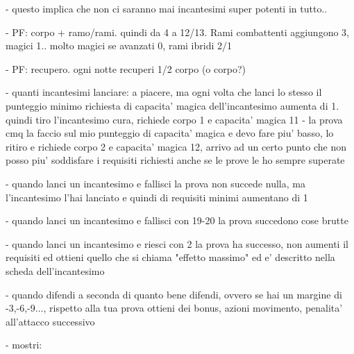 \documentclass[12pt,a4paper,twoside,openany,twocolumn]{book}
\begin{document}
- questo implica che non ci saranno mai incantesimi super potenti in tutto..

- PF: corpo + ramo/rami. quindi da 4 a 12/13. Rami combattenti aggiungono 3, 
magici 1.. molto magici se avanzati 0, rami ibridi 2/1

- PF: recupero. ogni notte recuperi 1/2 corpo (o corpo?)

- quanti incantesimi lanciare:  a piacere, ma ogni volta che lanci lo stesso il punteggio minimo richiesta di capacita' magica dell'incantesimo aumenta di 1. quindi tiro l'incantesimo cura, richiede corpo 1 e capacita' magica 11 - la prova cmq la faccio sul mio punteggio di capacita' magica e devo fare piu' basso, lo ritiro e richiede corpo 2 e capacita' magica 12, arrivo ad un certo punto che non posso piu' soddisfare i requisiti richiesti anche se le prove le ho sempre superate

- quando lanci un incantesimo e fallisci la prova non succede nulla, ma l'incantesimo l'hai lanciato e quindi di requisiti minimi aumentano di 1

- quando lanci un incantesimo e fallisci con 19-20 la prova succedono cose  brutte

- quando lanci un incantesimo e riesci con 2 la prova ha successo, non aumenti il requisiti ed ottieni quello che si chiama "effetto massimo" ed e' descritto nella scheda dell'incantesimo

- quando difendi  a seconda di quanto bene difendi, ovvero se hai un margine di -3,-6,-9..., rispetto alla tua prova ottieni dei bonus, azioni movimento, penalita' all'attacco successivo

- mostri:
\end{document}
